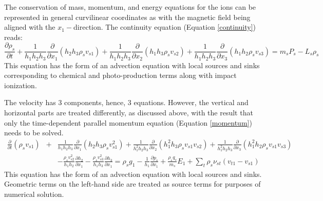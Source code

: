 \documentclass[11pt,letterpaper]{article}
\begin{document}
The conservation of mass, momentum, and energy equations for the ions can be represented in general curvilinear coordinates as with the magnetic field being aligned with the $x_1-$direction.  The continuity equation (Equation \ref{continuity}) reads: 
\begin{equation}
\frac{\partial \rho_s}{\partial t} + \frac{1}{h_1 h_2 h_3} \frac{\partial}{\partial x_1} \left( h_2 h_3 \rho_s v_{s1} \right) + \frac{1}{h_1 h_2 h_3} \frac{\partial}{\partial x_2} \left( h_1 h_3 \rho_s v_{s2} \right) + \frac{1}{h_1 h_2 h_3} \frac{\partial}{\partial x_3} \left( h_1 h_2 \rho_s v_{s3} \right) =  m_s P_s - L_s \rho_s \label{eqn:continuitycoord}
\end{equation}
This equation has the form of an advection equation with local sources and sinks corresponding to chemical and photo-production terms along with impact ionization.

The velocity has 3 components, hence, 3 equations.  However, the vertical and horizontal parts are treated differently, as discussed above, with the result that only the time-dependent parallel momentum equation (Equation \ref{momentum}) needs to be solved.  %
\begin{eqnarray}
\frac{\partial}{\partial t} \left( \rho_s v_{s1} \right) &+& \frac{1}{h_1 h_2 h_3} \frac{\partial}{\partial x_1} \left( h_2 h_3 \rho_s v_{s1}^2 \right) + \frac{1}{h_1^2 h_2 h_3} \frac{\partial}{\partial x_2} \left( h_1^2 h_3 \rho_s v_{s1} v_{s2} \right) + \frac{1}{h_1^2 h_2 h_3} \frac{\partial}{\partial x_3} \left( h_1^2 h_2 \rho_s v_{s1} v_{s3} \right) \nonumber \\
~ &~& - \frac{\rho_s v_{s2}^2}{h_1 h_2} \frac{\partial h_2}{\partial x_1} - \frac{\rho_s v_{s3}^2}{h_1 h_3} \frac{\partial h_3}{\partial x_1}  = \rho_s g_1 - \frac{1}{h_1} \frac{\partial p_s}{\partial x_1} + \frac{\rho_s q_s}{m_s} E_1 + \sum_t \rho_s \nu_{st} \left( v_{t1} - v_{s1} \right) \label{eqn:momentumcoord}
\end{eqnarray}
This equation has the form of an advection equation with local sources and sinks.  Geometric terms on the left-hand side are treated as source terms for purposes of numerical solution.
\end{document}
